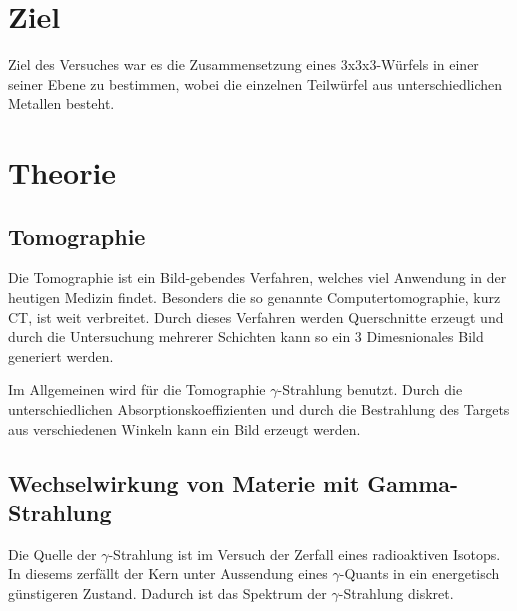 \section{Ziel}
Ziel des Versuches war es die Zusammensetzung eines 3x3x3-Würfels in einer seiner Ebene zu bestimmen, wobei die einzelnen Teilwürfel aus unterschiedlichen Metallen besteht. 

\section{Theorie}
\subsection{Tomographie}
Die Tomographie ist ein Bild-gebendes Verfahren, welches viel Anwendung in der heutigen Medizin findet. Besonders die so genannte Computertomographie, kurz CT, ist weit 
verbreitet.
Durch dieses Verfahren werden Querschnitte erzeugt und durch die Untersuchung mehrerer Schichten kann so ein 3 Dimesnionales Bild generiert werden.

\noindent
Im Allgemeinen wird für die Tomographie $\gamma$-Strahlung benutzt. Durch die unterschiedlichen Absorptionskoeffizienten und durch die Bestrahlung des Targets aus 
verschiedenen Winkeln kann ein Bild erzeugt werden.

\subsection{Wechselwirkung von Materie mit Gamma-Strahlung}
Die Quelle der $\gamma$-Strahlung ist im Versuch der Zerfall eines radioaktiven Isotops. In diesems zerfällt
der Kern unter Aussendung eines $\gamma$-Quants in ein energetisch günstigeren Zustand. Dadurch ist das 
Spektrum der $\gamma$-Strahlung diskret.

